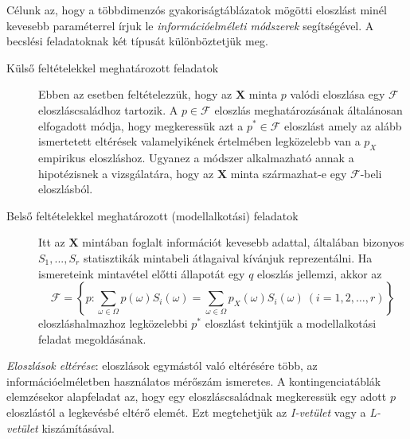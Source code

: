 \documentclass[DIV=15,appendixprefix]{scrreprt}
\theoremstyle{definition}
\theoremstyle{remark}
\begin{document}
Célunk az, hogy a többdimenzós gyakoriságtáblázatok
mögötti eloszlást minél kevesebb paraméterrel írjuk le \emph{információelméleti módszerek}
segítségével. A becslési feladatoknak két típusát különböztetjük meg.
\begin{description}
	\item[Külső feltételekkel meghatározott feladatok] Ebben az esetben feltételezzük, hogy az
	$\mathbf{X}$ minta $p$ valódi eloszlása egy $\mathcal{F}$ eloszláscsaládhoz tartozik. A $p\in
	\mathcal{F}$ eloszlás meghatározásának általánosan elfogadott módja, hogy megkeressük azt a
	$p^* \in \mathcal{F}$ eloszlást amely az alább ismertetett eltérések valamelyikének értelmében
	legközelebb van a $p_X$ empirikus eloszláshoz. Ugyanez a módszer alkalmazható annak a
	hipotézisnek a vizsgálatára, hogy az $\mathbf{X}$ minta származhat-e egy $\mathcal{F}$-beli
	eloszlásból.
	\item[Belső feltételekkel meghatározott (modellalkotási) feladatok] Itt az $\mathbf{X}$ mintában
	foglalt információt kevesebb adattal, általában bizonyos $S_1 , . . . , S_r$ statisztikák
	mintabeli átlagaival kívánjuk reprezentálni. Ha ismereteink mintavétel előtti állapotát egy $q$
	eloszlás jellemzi, akkor az
	\begin{equation*}
		\mathcal{F}=\left\{
		p \colon \sum_{\omega \in \Omega} p\left(\omega\right) S_i\left(\omega\right)=
		\sum_{\omega \in \Omega} p_X\left(\omega\right) S_i\left(\omega\right) \  \left( i=1,{} 2,{} \ldots,{} r \right)
		\right\}
	\end{equation*}
	eloszláshalmazhoz legközelebbi $p^*$ eloszlást tekintjük a modellalkotási feladat megoldásának.
\end{description}
\emph{Eloszlások eltérése}: eloszlások egymástól való eltérésére több, az információelméletben
használatos mérőszám ismeretes. A kontingenciatáblák elemzésekor alapfeladat az, hogy egy
eloszláscsaládnak megkeressük egy adott $p$ eloszlástól a legkevésbé eltérő elemét. Ezt megtehetjük
az \emph{I-vetület} vagy a \emph{L-vetület} kiszámításával.
%
\end{document}
